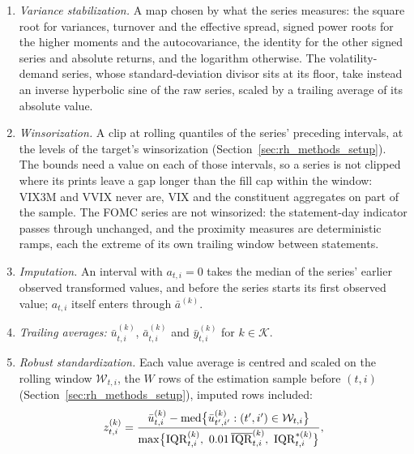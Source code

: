 \begin{itemize}
\begin{enumerate}
    $\mathcal{D}_{t,i}$ of the target's factor $s^2_{t,i}$ (Section~\ref{sec:rh_methods_setup}), bounded relative to
    the factor's own trailing median. The implied volatility indices, the StockTwits sentiment score and the FOMC
    series are not adjusted.
  \item \emph{Variance stabilization.} A map chosen by what the series measures: the square root for variances,
    turnover and the effective spread, signed power roots for the higher moments and the autocovariance, the identity
    for the other signed series and absolute returns, and the logarithm otherwise. The volatility-demand series,
    whose standard-deviation divisor sits at its floor, take instead an inverse hyperbolic sine of the raw series,
    scaled by a trailing average of its absolute value.
  \item \emph{Winsorization.} A clip at rolling quantiles of the series' preceding \rhdmWinsorWindow{} intervals, at the
    levels of the target's winsorization (Section~\ref{sec:rh_methods_setup}). The bounds need a value on each of
    those intervals, so a series is not clipped where its prints leave a gap longer than the fill cap within the
    window: VIX3M and VVIX never are, VIX and the constituent aggregates on part of the sample. The FOMC series are
    not winsorized: the statement-day indicator passes through unchanged, and the proximity measures are
    deterministic ramps, each the extreme of its own trailing window between statements.
  \item \emph{Imputation.} An interval with $a_{t,i} = 0$ takes the median of the series' earlier observed
    transformed values, and before the series starts its first observed value; $a_{t,i}$ itself enters through
    $\bar a^{(k)}$.
  \item \emph{Trailing averages:} $\bar u^{(k)}_{t,i}$, $\bar a^{(k)}_{t,i}$ and $\bar y^{(k)}_{t,i}$ for
    $k \in \mathcal{K}$.
  \item \emph{Robust standardization.} Each value average is centred and scaled on the rolling window
    $\mathcal{W}_{t,i}$, the $W$ rows of the estimation sample before $(t,i)$ (Section~\ref{sec:rh_methods_setup}),
    imputed rows included:
    \begin{gather*}
      z^{(k)}_{t,i} = \frac{\bar u^{(k)}_{t,i}
          - \operatorname{med}\bigl\{\bar u^{(k)}_{t',i'} : (t',i') \in \mathcal{W}_{t,i}\bigr\}}
        {\max\bigl\{\mathrm{IQR}^{(k)}_{t,i},\ \rhdmIqrFloorFrac\,\overline{\mathrm{IQR}}^{(k)}_{t,i},\
          \mathrm{IQR}^{\ast(k)}_{t,i}\bigr\}}, \\

\end{gather*}
\end{enumerate}
\end{itemize}
